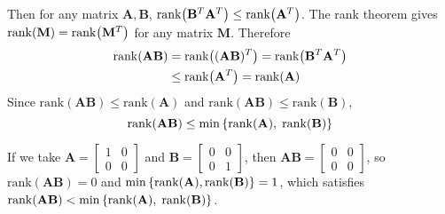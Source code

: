 \documentclass[10pt]{article}
\begin{document}
Then for any matrix $\mathbf{A}, \mathbf{B}$, $\mathrm{rank}\qty(\mathbf{B}^T\mathbf{A}^T) \leq \mathrm{rank}\qty(\mathbf{A}^T)$.
The rank theorem gives $\mathrm{rank}(\mathbf{M}) = \mathrm{rank}\qty(\mathbf{M}^T)$ for any matrix $\mathbf{M}$. Therefore
\begin{align*}
    \mathrm{rank}(\mathbf{AB}) &= \mathrm{rank}\qty((\mathbf{AB})^T) = \mathrm{rank}\qty(\mathbf{B}^T\mathbf{A}^T) \\
    &\leq \mathrm{rank}\qty(\mathbf{A}^T) = \mathrm{rank}(\mathbf{A})
\end{align*}
Since $\mathrm{rank}(\mathbf{AB}) \leq \mathrm{rank}(\mathbf{A})$ and $\mathrm{rank}(\mathbf{AB}) \leq \mathrm{rank}(\mathbf{B})$, 
$$\mathrm{rank}(\mathbf{AB}) \leq \min\qty{\mathrm{rank}(\mathbf{A}), \; \mathrm{rank}(\mathbf{B})}$$

If we take $\mathbf{A} = \begin{bmatrix}
    1 & 0 \\ 0 & 0
\end{bmatrix}$ and  $\mathbf{B} = \begin{bmatrix}
    0 & 0 \\ 0 & 1
\end{bmatrix}$, then $\mathbf{AB} = \begin{bmatrix}
    0 & 0 \\ 0 & 0
\end{bmatrix}$, so $\mathrm{rank}(\mathbf{AB}) = 0$ and $\min\qty{\mathrm{rank}(\mathbf{A}), \mathrm{rank}(\mathbf{B})} = 1$, which satisfies $\mathrm{rank}(\mathbf{AB}) < \min\qty{\mathrm{rank}(\mathbf{A}), \; \mathrm{rank}(\mathbf{B})}$.
\end{document}
